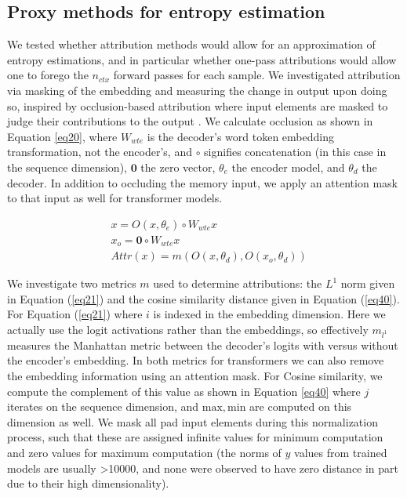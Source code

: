 \documentclass{article}
\begin{document}
   \subsection{Proxy methods for entropy estimation} \label{proxysection}

   We tested whether attribution methods would allow for an approximation of entropy estimations, and in particular whether one-pass attributions would allow one to forego the $n_{ctx}$ forward passes for each sample. We investigated attribution via masking of the embedding and measuring the change in output upon doing so, inspired by occlusion-based attribution where input elements are masked to judge their contributions to the output \citep{ancona2018betterunderstandinggradientbasedattribution}. We calculate occlusion as shown in Equation \ref{eq20}, where $W_{wte}$ is the decoder's word token embedding transformation, not the encoder's, and $\circ$ signifies concatenation (in this case in the sequence dimension), $\mathbf{0}$ the zero vector, $\theta_e$ the encoder model, and $\theta_d$ the decoder. In addition to occluding the memory input, we apply an attention mask to that input as well for transformer models.
    
    \begin{equation}
    \begin{split}
    &x = O(x, \theta_e) \circ W_{wte}x \\
    &x_o = \mathbf{0} \circ W_{wte}x \\
    &Attr(x) = m(O(x, \theta_d), O(x_o, \theta_d))
    \label{eq20}
    \end{split}
    \end{equation}
    
    We investigate two metrics $m$ used to determine attributions: the $L^1$ norm given in Equation (\ref{eq21}) and the cosine similarity distance given in Equation (\ref{eq40}). For Equation (\ref{eq21}) where $i$ is indexed in the embedding dimension. Here we actually use the logit activations rather than the embeddings, so effectively $m_{l^1}$ measures the Manhattan metric between the decoder's logits with versus without the encoder's embedding. In both metrics for transformers we can also remove the embedding information using an attention mask. For Cosine similarity, we compute the complement of this value as shown in Equation \ref{eq40} where $j$ iterates on the sequence dimension, and $\mathrm{max}, \mathrm{min}$ are computed on this dimension as well. We mask all pad input elements during this normalization process, such that these are assigned infinite values for minimum computation and zero values for maximum computation (the norms of $y$ values from trained models are usually >10000, and none were observed to have zero distance in part due to their high dimensionality).
    
\end{document}
